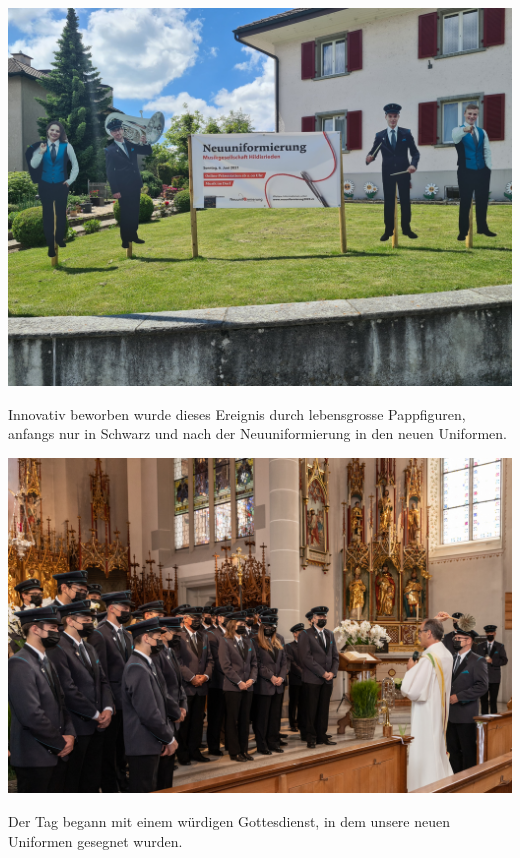 \begin{history}
    \begin{MulticolFigure}
        \centering
        \includegraphics[width=0.93\linewidth]{./chap/2001-2024/2021/Pappnasen.jpg}
    \end{MulticolFigure}

    Innovativ beworben wurde dieses Ereignis durch lebensgrosse Pappfiguren,
    anfangs nur in Schwarz und nach der Neuuniformierung in den neuen Uniformen.


    \begin{MulticolFigure}
        \centering
        \includegraphics[width=0.93\linewidth]{./chap/2001-2024/2021/Im-Chor-2.jpg}
    \end{MulticolFigure}


    Der Tag begann mit einem würdigen Gottesdienst, in dem unsere neuen
    Uniformen gesegnet wurden.


\end{history}
